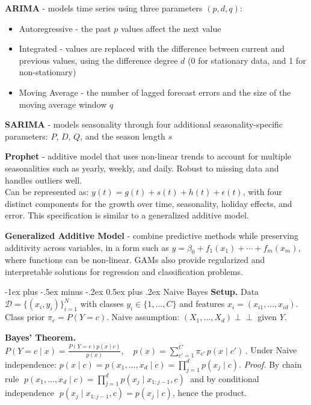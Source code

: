 \documentclass[10pt,landscape]{article}
\makeatletter
\renewcommand{\section}{\@startsection{section}{1}{0mm}%
                                {-1ex plus -.5ex minus -.2ex}%
                                {0.5ex plus .2ex}%
                                {\normalfont\large\bfseries}}
\makeatother
\begin{document}
\begin{multicols}{3}
        \textbf{ARIMA} - models time series using three parameters $(p,d,q)$:
        \begin{itemize}[label={--},leftmargin=4mm]
            \itemsep -.4mm
            \item Autoregressive - the past $p$ values affect the next value

            \item Integrated - values are replaced with the difference between current and previous values, using the difference degree $d$ (0 for stationary data, and 1 for non-stationary)

            \item Moving Average - the number of lagged forecast errors and the size of the moving average window $q$
        \end{itemize}

        \textbf{SARIMA} - models seasonality through four additional seasonality-specific parameters: $P$, $D$, $Q$, and the season length $s$
        \smallskip

        \textbf{Prophet} - additive model that uses non-linear trends to account for multiple seasonalities such as yearly, weekly, and daily. Robust to missing data and handles outliers well.\\ Can be represented as: $y(t) = g(t) + s(t) + h(t) + \epsilon(t)$, with four distinct components for the growth over time, seasonality, holiday effects, and error. This specification is similar to a generalized additive model.
        \smallskip

        \textbf{Generalized Additive Model} - combine predictive methods while preserving additivity across variables, in a form such as
    $y = \beta_0 + f_1(x_1) + \cdots + f_m(x_m)$, where functions can be non-linear. GAMs also provide regularized and interpretable solutions for regression and classification problems.

        \section{Naive Bayes}
        \textbf{Setup.} Data $\mathcal{D}=\{(x_i,y_i)\}_{i=1}^N$ with classes $y_i\in\{1,\ldots,C\}$ and features $x_i=(x_{i1},\ldots,x_{id})$. Class prior $\pi_c=P(Y{=}c)$. Naive assumption: $(X_1,\ldots,X_d)\perp\!\!\!\perp$ given $Y$.
        \vspace{.2em}

        \textbf{Bayes' Theorem.}
    $\displaystyle P(Y{=}c\mid x)=\frac{P(Y{=}c)p(x\mid c)}{p(x)},\quad
    p(x)=\sum_{c'=1}^C \pi_{c'}\,p(x\mid c')\,.$
        \; Under Naive independence: $\displaystyle p(x\mid c)=p(x_1,\ldots,x_d\mid c)=\prod_{j=1}^d p(x_j\mid c)$.
        \; \textit{Proof.} By chain rule $\;p(x_1,\ldots,x_d\mid c)=\prod_{j=1}^d p(x_j\mid x_{1:j-1},c)\;$ and by conditional independence $\;p(x_j\mid x_{1:j-1},c)=p(x_j\mid c)$, hence the product.


\end{multicols}
\end{document}

